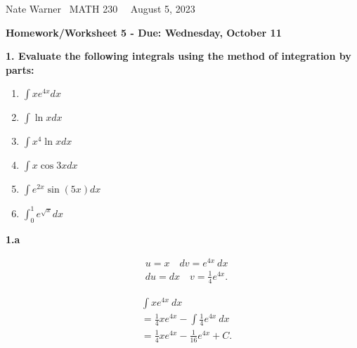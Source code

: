 \documentclass{report}
\title{\Huge{}}
\author{\huge{Nathan Warner}}
\date{\huge{}}
\begin{document}
    \pagebreak \bigbreak \noindent
    Nate Warner \ \quad \quad \quad \quad \quad \quad \quad \quad \quad \quad \quad \quad \quad \quad \quad \quad \quad  MATH 230 \quad  \quad \quad \quad \quad \quad \quad \quad \quad \ \ \quad \quad August 5, 2023
    \begin{center}
        \textbf{Homework/Worksheet 5 - Due: Wednesday, October 11}
    \end{center}
    \bigbreak \noindent 
    \begin{mdframed}
        \textbf{1. Evaluate the following integrals using the method of integration by parts:}
        \begin{enumerate}[label=(\alph*)]
            \item $\int x e^{4 x} d x$
            \item $\int \ln x d x$
            \item $\int x^4 \ln x d x$
            \item $\int x \cos 3 x d x$
            \item $\int e^{2 x} \sin (5 x) d x$
            \item $\int_0^1 e^{\sqrt{x}} d x$
        \end{enumerate}
    \end{mdframed}

    \bigbreak \noindent 
    \textbf{1.a}
    \bigbreak \noindent 
    \begin{minipage}[t]{0.47\textwidth}
    \begin{align*}
        &u = x \quad dv = e^{4x}\ dx \\
        &du = dx \quad v = \frac{1}{4}e^{4x}
    .\end{align*}    
    \end{minipage}
    \begin{minipage}[t]{0.47\textwidth}
    \begin{align*}
        &\int xe^{4x}\ dx \\
        &=\frac{1}{4}xe^{4x} - \int \frac{1}{4}e^{4x}\ dx \\
        &= \frac{1}{4}xe^{4x} - \frac{1}{16}e^{4x} + C
    .\end{align*}
    \end{minipage}
\end{document}
